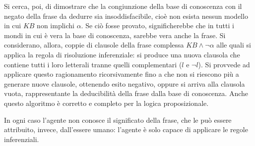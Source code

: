 		Si cerca, poi, di dimostrare che la congiunzione della base di conoscenza con il negato della frase da dedurre sia insoddisfacibile, cioè non esista nessun modello in cui $KB$ non implichi $\alpha$. Se ciò fosse provato, significherebbe che in tutti i mondi in cui è vera la base di conoscenza, sarebbe vera anche la frase. Si considerano, allora, coppie di clausole della frase complessa $KB\wedge \neg \alpha$ alle quali si applica la regola di risoluzione inferenziale: si produce una nuova clausola che contiene tutti i loro letterali tranne quelli complementari ($l$ e $\neg l$). Si provvede ad 
		applicare questo ragionamento ricorsivamente fino a che non si riescono più a generare nuove clausole, ottenendo esito negativo, oppure si arriva alla clausola vuota, rappresentante la deducibilità della frase dalla base di conoscenza. Anche questo algoritmo è corretto e completo per la logica proposizionale.\par
		In ogni caso l'agente non conosce il significato della frase, che le può essere attribuito, invece, dall'essere umano: l'agente è solo capace di applicare le regole inferenziali.
		
